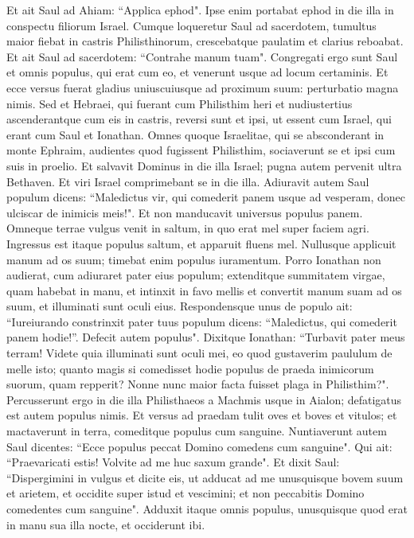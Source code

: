 \begin{biblechapter}
\verse Et ait Saul ad Ahiam: “Applica ephod". Ipse enim portabat ephod in die illa in conspectu filiorum Israel. 
\verse Cumque loqueretur Saul ad sacerdotem, tumultus maior fiebat in castris Philisthinorum, crescebatque paulatim et clarius reboabat. Et ait Saul ad sacerdotem: “Contrahe manum tuam". 
\verse Congregati ergo sunt Saul et omnis populus, qui erat cum eo, et venerunt usque ad locum certaminis. Et ecce versus fuerat gladius uniuscuiusque ad proximum suum: perturbatio magna nimis. 
\verse Sed et Hebraei, qui fuerant cum Philisthim heri et nudiustertius ascenderantque cum eis in castris, reversi sunt et ipsi, ut essent cum Israel, qui erant cum Saul et Ionathan. 
\verse Omnes quoque Israelitae, qui se absconderant in monte Ephraim, audientes quod fugissent Philisthim, sociaverunt se et ipsi cum suis in proelio. 
\verse Et salvavit Dominus in die illa Israel; pugna autem pervenit ultra Bethaven. 
\verse Et viri Israel comprimebant se in die illa. Adiuravit autem Saul populum dicens: “Maledictus vir, qui comederit panem usque ad vesperam, donec ulciscar de inimicis meis!". Et non manducavit universus populus panem. 
\verse Omneque terrae vulgus venit in saltum, in quo erat mel super faciem agri. 
\verse Ingressus est itaque populus saltum, et apparuit fluens mel. Nullusque applicuit manum ad os suum; timebat enim populus iuramentum. 
\verse Porro Ionathan non audierat, cum adiuraret pater eius populum; extenditque summitatem virgae, quam habebat in manu, et intinxit in favo mellis et convertit manum suam ad os suum, et illuminati sunt oculi eius. 
\verse Respondensque unus de populo ait: “Iureiurando constrinxit pater tuus populum dicens: “Maledictus, qui comederit panem hodie!”. Defecit autem populus". 
\verse Dixitque Ionathan: “Turbavit pater meus terram! Videte quia illuminati sunt oculi mei, eo quod gustaverim paululum de melle isto; 
\verse quanto magis si comedisset hodie populus de praeda inimicorum suorum, quam repperit? Nonne nunc maior facta fuisset plaga in Philisthim?". 
\verse Percusserunt ergo in die illa Philisthaeos a Machmis usque in Aialon; defatigatus est autem populus nimis. 
\verse Et versus ad praedam tulit oves et boves et vitulos; et mactaverunt in terra, comeditque populus cum sanguine.  
\verse Nuntiaverunt autem Saul dicentes: “Ecce populus peccat Domino comedens cum sanguine". Qui ait: “Praevaricati estis! Volvite ad me huc saxum grande".  
\verse Et dixit Saul: “Dispergimini in vulgus et dicite eis, ut adducat ad me unusquisque bovem suum et arietem, et occidite super istud et vescimini; et non peccabitis Domino comedentes cum sanguine". Adduxit itaque omnis populus, unusquisque quod erat in manu sua illa nocte, et occiderunt ibi. 

\end{biblechapter}
